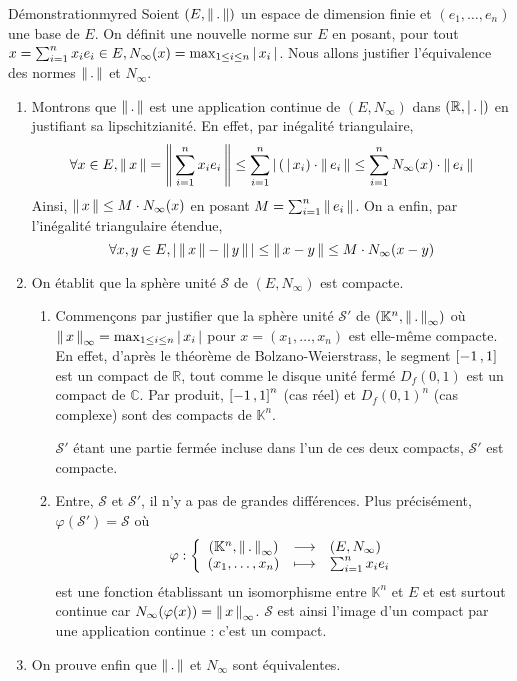     \begin{demo}{Démonstration}{myred}
        Soient $\left(E, \left\lVert \,. \, \right\rVert\right)$ un espace de dimension finie et $(e_1,\ldots,e_n)$ une base de $E$. On définit une nouvelle norme sur $E$ en posant, pour tout $x = \sum_{i = 1}^n x_i e_i \in E, N_{\infty}(x) = \max_{1 \leq i \leq n} \left\lvert \,x_i \, \right\rvert$. Nous allons justifier l’équivalence des normes $\left\lVert \,. \, \right\rVert$ et $N_{\infty}$.
        \begin{enumerate}
            \item Montrons que $\left\lVert \,. \, \right\rVert$ est une application continue de $(E,N_{\infty})$ dans $(\mathbb{R}, \left\lvert \,. \, \right\rvert)$ en justifiant sa lipschitzianité. En effet, par inégalité triangulaire, 
            \[ \forall x \in E, \left\lVert \,x \, \right\rVert = \left\lVert \,\sum_{i = 1}^n x_i e_i \, \right\rVert \leq \sum_{i=1}^n \left\lvert \,( \, \right\rvert x_i) \cdot \left\lVert \,e_i \, \right\rVert \leq \sum_{i = 1}^n N_{\infty}(x) \cdot \left\lVert \,e_i \, \right\rVert \]
            Ainsi, $\left\lVert \,x \, \right\rVert \leq M \cdot N_{\infty}(x)$ en posant $M = \sum_{i = 1}^n \left\lVert \,e_i \, \right\rVert$. On a enfin, par l’inégalité triangulaire étendue, 
            \[ \forall x,y \in E, \left\lvert \,\left\lVert \,x \, \right\rVert - \left\lVert \,y \, \right\rVert \, \right\rvert \leq \left\lVert \,x-y \, \right\rVert \leq M \cdot N_{\infty} (x-y) \] 

            \item On établit que la sphère unité $\mathcal{S}$ de $(E, N_{\infty})$ est compacte. 
            \begin{enumerate}[label=(\alph*)]
                \item Commençons par justifier que la sphère unité $\mathcal{S}'$ de $\left(\mathbb{K}^n, \left\lVert \,. \, \right\rVert_{\infty}\right)$ où $\left\lVert \,x \, \right\rVert_{\infty} = \max_{1 \leq i \leq n} \left\lvert \,x_i \, \right\rvert$ pour $x = (x_1, \ldots, x_n)$ est elle-même compacte. En effet, d’après le théorème de Bolzano-Weierstrass, le segment $\left[ -1 \, , 1 \right]$ est un compact de $\mathbb{R}$, tout comme le disque unité fermé $D_f(0,1)$ est un compact de $\mathbb{C}$. Par produit, $\left[ -1 \, , 1 \right]^n$ (cas réel) et $D_f(0,1)^n$ (cas complexe) sont des compacts de $\mathbb{K}^n$. 
                
                $\mathcal{S}'$ étant une partie fermée incluse dans l’un de ces deux compacts, $\mathcal{S}'$ est compacte.

                \item Entre, $\mathcal{S}$ et $\mathcal{S}'$, il n’y a pas de grandes différences. Plus précisément, $\varphi(\mathcal{S}') = \mathcal{S}$ où 
                \[ \fonction{\varphi}{\left(\mathbb{K}^n, \norm{.}_{\infty}\right)}{\left(E,N_{\infty}\right)}{(x_1,\ldots,x_n)}{\sum_{i=1}^n x_i e_i} \] 
                est une fonction établissant un isomorphisme entre $\mathbb{K}^n$ et $E$ et est surtout continue car $N_{\infty} (\varphi(x)) = \left\lVert \,x \, \right\rVert_{\infty}$. $\mathcal{S}$ est ainsi l’image d’un compact par une application continue : c’est un compact.
            \end{enumerate}
            \item On prouve enfin que $\left\lVert \,. \, \right\rVert$ et $N_{\infty}$ sont équivalentes. 
            

\end{enumerate}
\end{demo}
